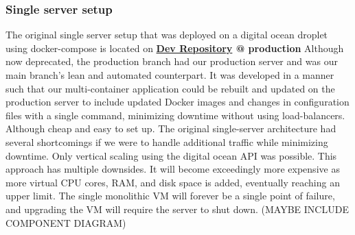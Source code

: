 \subsubsection{Single server setup}
\label{subsubsec:scalingProd}
The original single server setup that was deployed on a digital ocean droplet using docker-compose is located on \textbf{\hyperref[app:devRepo]{Dev Repository} @ production}
Although now deprecated, the production branch had our production server and was our main branch's lean and automated counterpart. It was developed in a manner such that our multi-container application could be rebuilt and updated on the production server to include updated Docker images and changes in configuration files with a single command, minimizing downtime without using load-balancers.\\
Although cheap and easy to set up. The original single-server architecture had several shortcomings if we were to handle additional traffic while minimizing downtime.
Only vertical scaling using the digital ocean API was possible. This approach has multiple downsides. It will become exceedingly more expensive as more virtual CPU cores, RAM, and disk space is added, eventually reaching an upper limit. The single monolithic VM will forever be a single point of failure, and upgrading the VM will require the server to shut down.
(MAYBE INCLUDE COMPONENT DIAGRAM)

